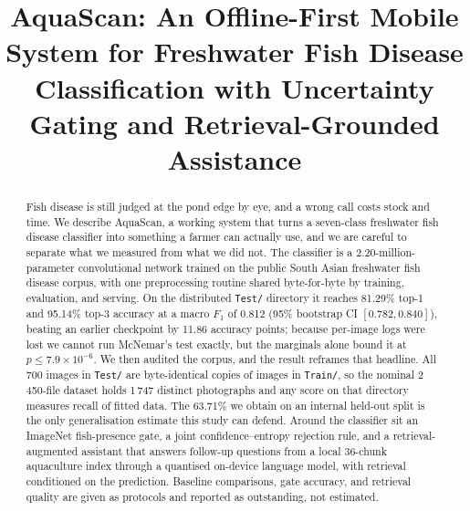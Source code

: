 \documentclass[conference]{IEEEtran}
\begin{document}
\title{AquaScan: An Offline-First Mobile System for Freshwater
Fish Disease Classification with Uncertainty Gating and
Retrieval-Grounded Assistance}

\author{
\and
{}
}

\maketitle

\begin{abstract}
Fish disease is still judged at the pond edge by eye, and a wrong call costs stock and time. We describe AquaScan, a working system that turns a seven-class freshwater fish disease classifier into something a farmer can actually use, and we are careful to separate what we measured from what we did not. The classifier is a 2.20-million-parameter convolutional network trained on the public South Asian freshwater fish disease corpus, with one preprocessing routine shared byte-for-byte by training, evaluation, and serving. On the distributed \texttt{Test/} directory it reaches 81.29\% top-1 and 95.14\% top-3 accuracy at a macro $F_1$ of 0.812 (95\% bootstrap CI $[0.782,0.840]$), beating an earlier checkpoint by 11.86 accuracy points; because per-image logs were lost we cannot run McNemar's test exactly, but the marginals alone bound it at $p \leq 7.9\times10^{-6}$. We then audited the corpus, and the result reframes that headline. All 700 images in \texttt{Test/} are byte-identical copies of images in \texttt{Train/}, so the nominal 2\,450-file dataset holds 1\,747 distinct photographs and any score on that directory measures recall of fitted data. The 63.71\% we obtain on an internal held-out split is the only generalisation estimate this study can defend. Around the classifier sit an ImageNet fish-presence gate, a joint confidence--entropy rejection rule, and a retrieval-augmented assistant that answers follow-up questions from a local 36-chunk aquaculture index through a quantised on-device language model, with retrieval conditioned on the prediction. Baseline comparisons, gate accuracy, and retrieval quality are given as protocols and reported as outstanding, not estimated.
\end{abstract}
\end{document}
